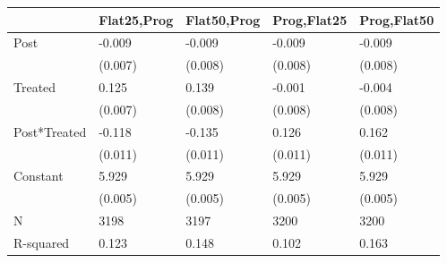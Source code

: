 \begin{tabular}{lllll}
\toprule
 & Flat25,Prog & Flat50,Prog & Prog,Flat25 & Prog,Flat50 \\
\midrule
Post & -0.009 & -0.009 & -0.009 & -0.009 \\
 & (0.007) & (0.008) & (0.008) & (0.008) \\
Treated & 0.125 & 0.139 & -0.001 & -0.004 \\
 & (0.007) & (0.008) & (0.008) & (0.008) \\
Post*Treated & -0.118 & -0.135 & 0.126 & 0.162 \\
 & (0.011) & (0.011) & (0.011) & (0.011) \\
Constant & 5.929 & 5.929 & 5.929 & 5.929 \\
 & (0.005) & (0.005) & (0.005) & (0.005) \\
N & 3198 & 3197 & 3200 & 3200 \\
R-squared & 0.123 & 0.148 & 0.102 & 0.163 \\
\bottomrule
\end{tabular}
